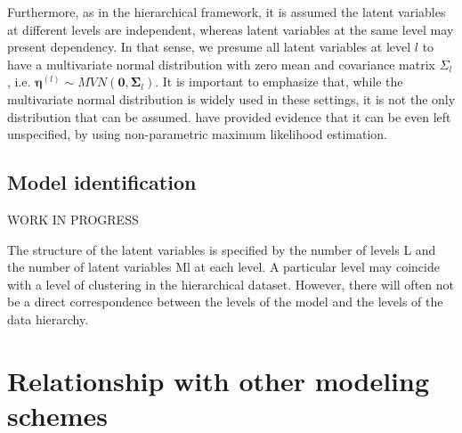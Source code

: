 Furthermore, as in the hierarchical framework, it is assumed the latent variables at different levels are independent, whereas latent variables at the same level may present dependency. In that sense, we presume all latent variables at level $l$ to have a multivariate normal distribution with zero mean and covariance matrix $\Sigma_{l}$, i.e. $\pmb{\eta}^{(l)} \sim MVN(\mathbf{0}, \pmb{\Sigma}_{l})$. It is important to emphasize that, while the multivariate normal distribution is widely used in these settings, it is not the only distribution that can be assumed. \citet{Rabe_et_al_2003a} have provided evidence that it can be even left unspecified, by using non-parametric maximum likelihood estimation.



\subsection{Model identification}
{\color{red} WORK IN PROGRESS
	
	The structure of the latent variables is specified by the number of levels L and the number of latent variables Ml at each level. A particular level may coincide with a level of clustering in the hierarchical dataset. However, there will often not be a direct correspondence between the levels of the model and the levels of the data hierarchy.
}


\section{Relationship with other modeling schemes}

